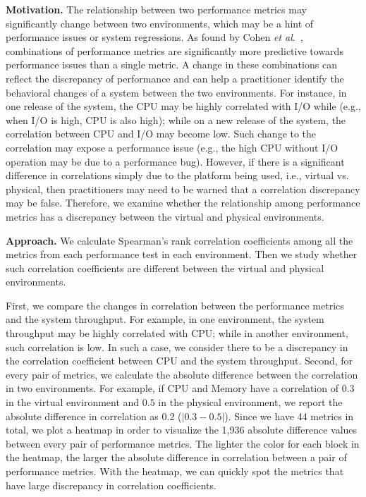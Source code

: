 \documentclass[smallextended]{svjour3}       %
\begin{document}
\noindent \textbf{Motivation.}
The relationship between two performance metrics may significantly change between two environments, which may be a hint of performance issues or system regressions. 
As found by Cohen \emph{et al$.$}~\cite{cohen2004correlating}, combinations of performance metrics are significantly more predictive towards performance issues than a single metric. A change in these combinations can reflect the discrepancy of performance and can help a practitioner identify the behavioral changes of a system between the two environments. For instance, in one release of the system, the CPU may be highly correlated with I/O while (e.g., when I/O is high, CPU is also high); while on a new release of the system, the correlation between CPU and I/O may become low. Such change to the correlation may expose a performance issue (e.g., the high CPU without I/O operation may be due to a performance bug). However, if there is a significant difference in correlations simply due to the platform being used, i.e., virtual vs. physical, then practitioners may need to be warned that a correlation discrepancy may be false. Therefore, we examine whether the relationship among performance metrics has a discrepancy between the virtual and physical environments. 


\noindent \textbf{Approach.} 
We calculate Spearman's rank correlation coefficients among all the metrics from each performance test in each environment. Then we study whether such correlation coefficients are different between the virtual and physical environments. 

First, we compare the changes in correlation between the performance metrics and the system throughput. For example, in one environment, the system throughput may be highly correlated with CPU; while in another environment, such correlation is low. In such a case, we consider there to be a discrepancy in the correlation coefficient between CPU and the system throughput. Second, for every pair of metrics, we calculate the absolute difference between the correlation in two environments. For example, if CPU and Memory have a correlation of $0.3$ in the virtual environment and $0.5$ in the physical environment, we report the absolute difference in correlation as $0.2$ ($|0.3-0.5|$). Since we have 44 metrics in total, we plot a heatmap in order to visualize the 1,936 absolute difference values between every pair of performance metrics. The lighter the color for each block in the heatmap, the larger the absolute difference in correlation between a pair of performance metrics. With the heatmap, we can quickly spot the metrics that have large discrepancy in correlation coefficients. 
\end{document}
